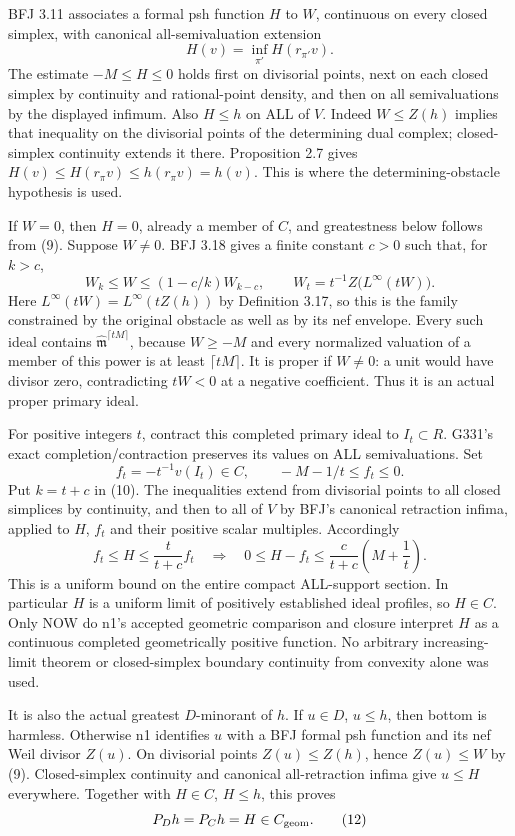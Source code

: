 \documentclass[11pt]{article}
\begin{document}
BFJ 3.11 associates a formal psh function \(H\) to \(W\), continuous on every closed simplex, with canonical all-semivaluation extension
\[
H(v)=\inf_{\pi'} H(r_{\pi'}v).
\]
The estimate \(-M\le H\le0\) holds first on divisorial points, next on each closed simplex by continuity and rational-point density, and then on all semivaluations by the displayed infimum. Also \(H\le h\) on ALL of \(V\). Indeed \(W\le Z(h)\) implies that inequality on the divisorial points of the determining dual complex; closed-simplex continuity extends it there. Proposition 2.7 gives \(H(v)\le H(r_\pi v)\le h(r_\pi v)=h(v)\). This is where the determining-obstacle hypothesis is used.

If \(W=0\), then \(H=0\), already a member of \(C\), and greatestness below follows from (9). Suppose \(W\ne0\). BFJ 3.18 gives a finite constant \(c>0\) such that, for \(k>c\),
\[
W_k\le W\le(1-c/k)W_{k-c},
\qquad
W_t=t^{-1}Z\bigl(L^\infty(tW)\bigr). \tag{10}
\]
Here \(L^\infty(tW)=L^\infty(tZ(h))\) by Definition 3.17, so this is the family constrained by the original obstacle as well as by its nef envelope. Every such ideal contains \(\widehat{\mathfrak m}^{\lceil tM\rceil}\), because \(W\ge-M\) and every normalized valuation of a member of this power is at least \(\lceil tM\rceil\). It is proper if \(W\ne0\): a unit would have divisor zero, contradicting \(tW<0\) at a negative coefficient. Thus it is an actual proper primary ideal.

For positive integers \(t\), contract this completed primary ideal to \(I_t\subset R\). G331's exact completion/contraction preserves its values on ALL semivaluations. Set
\[
f_t=-t^{-1}v(I_t)\in C,\qquad -M-1/t\le f_t\le0.
\]
Put \(k=t+c\) in (10). The inequalities extend from divisorial points to all closed simplices by continuity, and then to all of \(V\) by BFJ's canonical retraction infima, applied to \(H\), \(f_t\) and their positive scalar multiples. Accordingly
\[
f_t\le H\le\frac{t}{t+c}f_t
\quad\Longrightarrow\quad
0\le H-f_t\le
\frac{c}{t+c}\left(M+\frac1t\right). \tag{11}
\]
This is a uniform bound on the entire compact ALL-support section. In particular \(H\) is a uniform limit of positively established ideal profiles, so \(H\in C\). Only NOW do n1's accepted geometric comparison and closure interpret \(H\) as a continuous completed geometrically positive function. No arbitrary increasing-limit theorem or closed-simplex boundary continuity from convexity alone was used.

It is also the actual greatest \(D\)-minorant of \(h\). If \(u\in D\), \(u\le h\), then bottom is harmless. Otherwise n1 identifies \(u\) with a BFJ formal psh function and its nef Weil divisor \(Z(u)\). On divisorial points \(Z(u)\le Z(h)\), hence \(Z(u)\le W\) by (9). Closed-simplex continuity and canonical all-retraction infima give \(u\le H\) everywhere. Together with \(H\in C\), \(H\le h\), this proves
\[
P_Dh=P_Ch=H\in C_{\rm geom}. \tag{12}
\]
\end{document}
